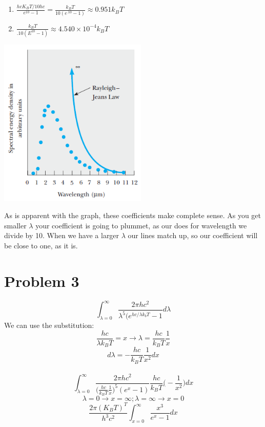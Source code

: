 \documentclass[11pt]{article}
\begin{document}
    \begin{enumerate}[label=\alph*)]
    \item $\frac{hcK_B T / 10hc}{e^{10}-1} = \frac{k_B T}{10(e^{.10}-1)} \approx 0.951 k_B T$
    
    \item $\frac{k_B T}{.10(E^{10} -1)} \approx 4.540 \times 10^{-4}k_B T$
    \end{enumerate}
    \begin{center}
    \includegraphics[width = 200pt]{Homework11/fig_3_12.PNG}
    \end{center}
    As is apparent with the graph, these coefficients make complete sense. As you get smaller $\lambda$ your coefficient is going to plummet, as our does for wavelength we divide by 10. When we have a larger $\lambda$ our lines match up, so our coefficient will be close to one, as it is. \faThumbsOUp
\newpage
    
\section*{Problem 3}
    \[\int_{\lambda = 0}^\infty \frac{2\pi hc^2}{\lambda^5 (e^{hc/\lambda k_b T}-1}d\lambda\]
    We can use the substitution:
    \[\frac{hc}{\lambda k_B T} = x \rightarrow \lambda = \frac{hc}{k_B T}\frac{1}{x}\]
    \[d\lambda = -\frac{hc}{k_B T}\frac{1}{x^2}dx\]\\
    
    \[\int_{\lambda = 0}^\infty \frac{2 \pi hc^2}{\Big(\frac{hc}{k_B T}\frac{1}{x}\Big)^5(e^x -1)}\frac{hc}{k_B T}\Big(-\frac{1}{x^2}\Big)dx\]
    \[\lambda = 0 \rightarrow x = \infty; \lambda = \infty \rightarrow x=0\]
    \[\frac{2\pi(K_B T)^T}{h^3 c^2}\int_{x=0}^\infty \frac{x^3}{e^x -1}dx\]
\end{document}
